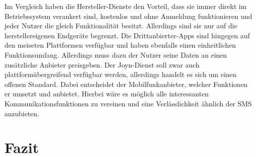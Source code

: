 \documentclass[german,12pt,a4paper]{article}
\begin{document}
    Im Vergleich haben die Hersteller-Dienste den Vorteil, dass sie immer direkt im Betriebssystem
    verankert sind, kostenlos und ohne Anmeldung funktionieren und jeder Nutzer die gleich
    Funktionalität besitzt. Allerdings sind sie nur auf die herstellereigenen
    Endgeräte begrenzt. Die Drittanbierter-Apps sind hingegen auf den meiseten Plattformen
    verfügbar und haben ebenfalls einen einheitlichen Funktionsumfang. Allerdings muss dazu der
    Nutzer seine Daten an einen zusätzliche Anbieter preisgeben. Der Joyn-Dienst soll zwar auch
    plattformübergreifend verfügbar werden, allerdings handelt es sich um einen offenen Standard.
    Dabei entscheidet der Mobilfunkanbieter, welcher Funktionen er umsetzt und anbietet. Hierbei
    wäre es möglich alle interessanten Kommunikationsfunktionen zu vereinen und eine Verlässlichkeit
    ähnlich der SMS anzubieten.



\section{Fazit} %
\label{sec:fazit}
\end{document}

